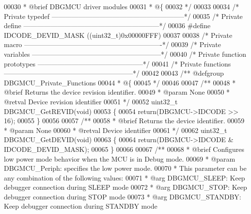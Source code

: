 \begin{DoxyCode}
00030 \textcolor{comment}{  * @brief DBGMCU driver modules}
00031 \textcolor{comment}{  * @\{}
00032 \textcolor{comment}{  */}
00033 
00034 \textcolor{comment}{/* Private typedef -----------------------------------------------------------*/}
00035 \textcolor{comment}{/* Private define ------------------------------------------------------------*/}
00036 \textcolor{preprocessor}{#}\textcolor{preprocessor}{define} \textcolor{preprocessor}{IDCODE\_DEVID\_MASK}    \textcolor{preprocessor}{(}\textcolor{preprocessor}{(}\textcolor{preprocessor}{uint32\_t}\textcolor{preprocessor}{)}0x00000FFF\textcolor{preprocessor}{)}
00037 
00038 \textcolor{comment}{/* Private macro -------------------------------------------------------------*/}
00039 \textcolor{comment}{/* Private variables ---------------------------------------------------------*/}
00040 \textcolor{comment}{/* Private function prototypes -----------------------------------------------*/}
00041 \textcolor{comment}{/* Private functions ---------------------------------------------------------*/}
00042 
00043 \textcolor{comment}{/** @defgroup DBGMCU\_Private\_Functions}
00044 \textcolor{comment}{  * @\{}
00045 \textcolor{comment}{  */}
00046 
00047 \textcolor{comment}{/**}
00048 \textcolor{comment}{  * @brief  Returns the device revision identifier.}
00049 \textcolor{comment}{  * @param  None}
00050 \textcolor{comment}{  * @retval Device revision identifier}
00051 \textcolor{comment}{  */}
00052 uint32\_t DBGMCU_GetREVID(\textcolor{keywordtype}{void})
00053 \{
00054    \textcolor{keywordflow}{return}(DBGMCU->IDCODE >> 16);
00055 \}
00056 
00057 \textcolor{comment}{/**}
00058 \textcolor{comment}{  * @brief  Returns the device identifier.}
00059 \textcolor{comment}{  * @param  None}
00060 \textcolor{comment}{  * @retval Device identifier}
00061 \textcolor{comment}{  */}
00062 uint32\_t DBGMCU_GetDEVID(\textcolor{keywordtype}{void})
00063 \{
00064    \textcolor{keywordflow}{return}(DBGMCU->IDCODE & IDCODE_DEVID_MASK);
00065 \}
00066 
00067 \textcolor{comment}{/**}
00068 \textcolor{comment}{  * @brief  Configures low power mode behavior when the MCU is in Debug mode.}
00069 \textcolor{comment}{  * @param  DBGMCU\_Periph: specifies the low power mode.}
00070 \textcolor{comment}{  *   This parameter can be any combination of the following values:}
00071 \textcolor{comment}{  *     @arg DBGMCU\_SLEEP: Keep debugger connection during SLEEP mode              }
00072 \textcolor{comment}{  *     @arg DBGMCU\_STOP: Keep debugger connection during STOP mode               }
00073 \textcolor{comment}{  *     @arg DBGMCU\_STANDBY: Keep debugger connection during STANDBY mode        }

\end{DoxyCode}
